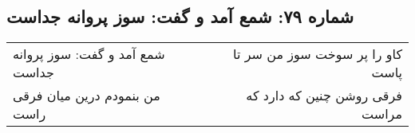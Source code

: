 \begin{center}
\section*{شماره ۷۹: شمع آمد و گفت: سوز پروانه جداست}
\label{sec:079}
\begin{longtable}{l p{0.5cm} r}
شمع آمد و گفت: سوز پروانه جداست
&&
کاو را پر سوخت سوز من سر تا پاست
\\
من بنمودم درین میان فرقی راست
&&
فرقی روشن چنین که دارد که مراست
\\
\end{longtable}
\end{center}
